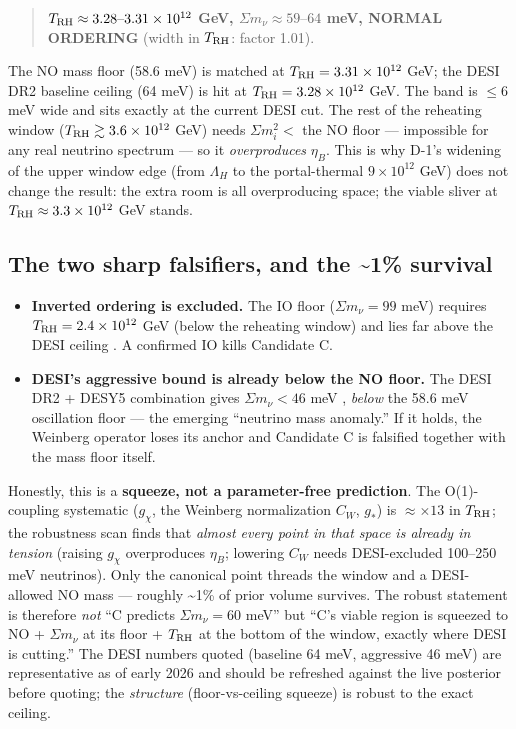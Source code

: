 \documentclass[aps,prd,preprint,nofootinbib,superscriptaddress]{revtex4-2}
\providecommand{\tightlist}{\setlength{\itemsep}{0pt}\setlength{\parskip}{0pt}}
\begin{document}
\begin{quote}
\textbf{\(T_{\rm RH} \approx 3.28\text{–}3.31\times10^{12}\) GeV,
\(\Sigma m_\nu \approx 59\text{–}64\) meV, NORMAL ORDERING} (width in
\(T_{\rm RH}\): factor 1.01).
\end{quote}

The NO mass floor (58.6 meV) is matched at
\(T_{\rm RH} = 3.31\times10^{12}\) GeV; the DESI DR2 baseline ceiling
(64 meV) \citep{Elbers:2025vlz} is hit at
\(T_{\rm RH} = 3.28\times10^{12}\) GeV. The band is \(\leq 6\) meV wide
and sits exactly at the current DESI cut. The rest of the reheating
window (\(T_{\rm RH} \gtrsim 3.6\times10^{12}\) GeV) needs
\(\Sigma m_i^{2} <\) the NO floor --- impossible for any real neutrino
spectrum --- so it \emph{overproduces} \(\eta_B\). This is why D-1's
widening of the upper window edge (from \(\Lambda_H\) to the
portal-thermal \(9\times10^{12}\) GeV) does not change the result: the
extra room is all overproducing space; the viable sliver at
\(T_{\rm RH} \approx 3.3\times10^{12}\) GeV stands.

\subsection{The two sharp falsifiers, and the \textasciitilde1\%
survival}\label{sec-5-3}

\begin{itemize}
\tightlist
\item
  \textbf{Inverted ordering is excluded.} The IO floor
  (\(\Sigma m_\nu = 99\) meV) requires \(T_{\rm RH} = 2.4\times10^{12}\)
  GeV (below the reheating window) and lies far above the DESI ceiling
  \citep{Elbers:2025vlz, Hannestad:2016fog}. A confirmed IO kills
  Candidate C.
\item
  \textbf{DESI's aggressive bound is already below the NO floor.} The
  DESI DR2 + DESY5 combination gives \(\Sigma m_\nu < 46\) meV
  \citep{Elbers:2025vlz}, \emph{below} the 58.6 meV oscillation floor
  --- the emerging ``neutrino mass anomaly.'' If it holds, the Weinberg
  operator loses its anchor and Candidate C is falsified together with
  the mass floor itself.
\end{itemize}

Honestly, this is a \textbf{squeeze, not a parameter-free prediction}.
The O(1)-coupling systematic (\(g_\chi\), the Weinberg normalization
\(C_W\), \(g_*\)) is \(\approx  \times 13\) in \(T_{\rm RH}\); the
robustness scan finds that \emph{almost every point in that space is
already in tension} (raising \(g_\chi\) overproduces \(\eta_B\);
lowering \(C_W\) needs DESI-excluded 100--250 meV neutrinos). Only the
canonical point threads the window and a DESI-allowed NO mass ---
roughly \textasciitilde1\% of prior volume survives. The robust
statement is therefore \emph{not} ``C predicts \(\Sigma m_\nu = 60\)
meV'' but ``C's viable region is squeezed to NO + \(\Sigma m_\nu\) at
its floor + \(T_{\rm RH}\) at the bottom of the window, exactly where
DESI is cutting.'' The DESI numbers quoted (baseline 64 meV, aggressive
46 meV) \citep{Elbers:2025vlz} are representative as of early 2026 and
should be refreshed against the live posterior before quoting; the
\emph{structure} (floor-vs-ceiling squeeze) is robust to the exact
ceiling.
\end{document}
